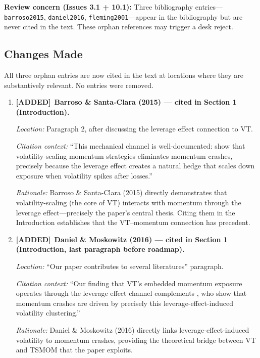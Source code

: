 \documentclass[12pt,a4paper]{article}
\newcommand{\ADDED}{\textcolor{added}{\textbf{[ADDED]}}}
\begin{document}
\noindent\textbf{Review concern (Issues 3.1 + 10.1):} Three bibliography entries---\texttt{barroso2015}, \texttt{daniel2016}, \texttt{fleming2001}---appear in the bibliography but are never cited in the text. These orphan references may trigger a desk reject.

\subsection{Changes Made}

All three orphan entries are now cited in the text at locations where they are substantively relevant. No entries were removed.

\begin{enumerate}[label=\arabic*.]

\item \ADDED\ \textbf{Barroso \& Santa-Clara (2015) --- cited in Section 1 (Introduction).}

\textit{Location:} Paragraph 2, after discussing the leverage effect connection to VT.

\textit{Citation context:} ``This mechanical channel is well-documented: \citet{barroso2015} show that volatility-scaling momentum strategies eliminates momentum crashes, precisely because the leverage effect creates a natural hedge that scales down exposure when volatility spikes after losses.''

\textit{Rationale:} Barroso \& Santa-Clara (2015) directly demonstrates that volatility-scaling (the core of VT) interacts with momentum through the leverage effect---precisely the paper's central thesis. Citing them in the Introduction establishes that the VT--momentum connection has precedent.

\item \ADDED\ \textbf{Daniel \& Moskowitz (2016) --- cited in Section 1 (Introduction, last paragraph before roadmap).}

\textit{Location:} ``Our paper contributes to several literatures'' paragraph.

\textit{Citation context:} ``Our finding that VT's embedded momentum exposure operates through the leverage effect channel complements \citet{daniel2016}, who show that momentum crashes are driven by precisely this leverage-effect-induced volatility clustering.''

\textit{Rationale:} Daniel \& Moskowitz (2016) directly links leverage-effect-induced volatility to momentum crashes, providing the theoretical bridge between VT and TSMOM that the paper exploits.


\end{enumerate}
\end{document}
